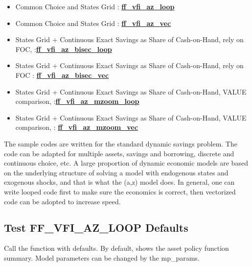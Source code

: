 \documentclass[
]{book}
\begin{document}
\begin{itemize}
\item
  Common Choice and States Grid :
  \href{https://github.com/FanWangEcon/MEconTools/blob/master/MEconTools/vfi/ff_vfi_az_loop.m}{\textbf{ff\_vfi\_az\_loop}}
\item
  Common Choice and States Grid :
  \href{https://github.com/FanWangEcon/MEconTools/blob/master/MEconTools/vfi/ff_vfi_az_vec.m}{\textbf{ff\_vfi\_az\_vec}}
\item
  States Grid + Continuous Exact Savings as Share of Cash-on-Hand,
  rely on FOC, :\href{https://github.com/FanWangEcon/MEconTools/blob/master/MEconTools/vfi/ff_vfi_az_bisec_loop.m}{\textbf{ff\_vfi\_az\_bisec\_loop}}
\item
  States Grid + Continuous Exact Savings as Share of Cash-on-Hand,
  rely on FOC :
  \href{https://github.com/FanWangEcon/MEconTools/blob/master/MEconTools/vfi/ff_vfi_az_bisec_vec.m}{\textbf{ff\_vfi\_az\_bisec\_vec}}
\item
  States Grid + Continuous Exact Savings as Share of Cash-on-Hand,
  VALUE comparison, :\href{https://github.com/FanWangEcon/MEconTools/blob/master/MEconTools/vfi/ff_vfi_az_mzoom_loop.m}{\textbf{ff\_vfi\_az\_mzoom\_loop}}
\item
  States Grid + Continuous Exact Savings as Share of Cash-on-Hand,
  VALUE comparison, :
  \href{https://github.com/FanWangEcon/MEconTools/blob/master/MEconTools/vfi/ff_vfi_az_mzoom_vec.m}{\textbf{ff\_vfi\_az\_mzoom\_vec}}
\end{itemize}

The sample codes are written for the standard dynamic savings problem.
The code can be adapted for multiple assets, savings and borrowing,
discrete and continuous choice, etc. A large proportion of dynamic
economic models are based on the underlying structure of solving a model
with endogenous states and exogenous shocks, and that is what the (a,z)
model does. In general, one can write looped code first to make sure the
economics is correct, then vectorized code can be adopted to increase
speed.

\hypertarget{test-ff_vfi_az_loop-defaults}{%
\subsection{Test FF\_VFI\_AZ\_LOOP Defaults}\label{test-ff_vfi_az_loop-defaults}}

Call the function with defaults. By default, shows the asset policy
function summary. Model parameters can be changed by the mp\_params.
\end{document}
